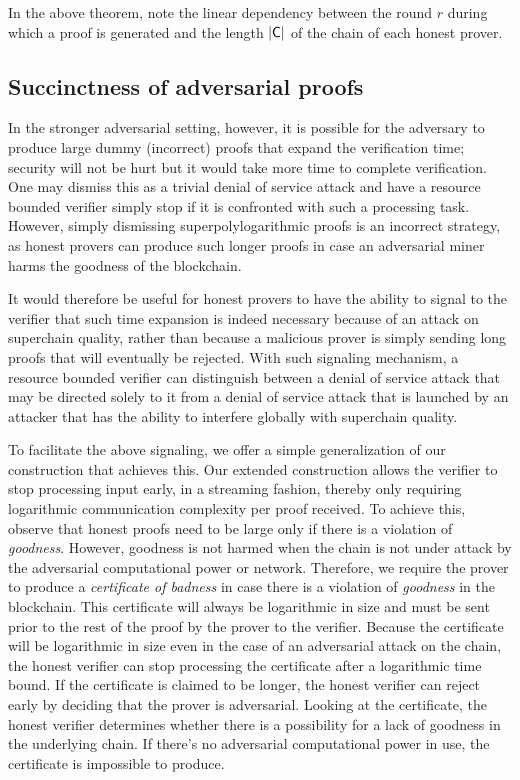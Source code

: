 In the above theorem, note the linear dependency between the round $r$ during
which a proof is generated and the length $|\mathsf{C}|$ of the chain of each honest
prover.

\subsection{Succinctness of adversarial proofs}
In the stronger adversarial setting, however, it is possible for the adversary
to produce large dummy (incorrect) proofs that expand the verification time;
security will not be hurt but it would take more time to complete verification.
One may dismiss this as a trivial denial of service attack and have a resource
bounded verifier simply stop if it is confronted with such a processing task.
However, simply dismissing superpolylogarithmic proofs is an incorrect strategy,
as honest provers can produce such longer proofs in case an adversarial miner
harms the goodness of the blockchain.

It would therefore be useful for honest provers to have the ability to
signal to the verifier that such time expansion is indeed necessary because of
an attack on superchain quality, rather than because a malicious prover is
simply sending long proofs that will eventually be rejected. With such signaling
mechanism, a resource bounded verifier can distinguish between a denial of
service attack that may be directed solely to it from  a denial of service
attack that  is launched by an attacker that has the ability to  interfere
globally with superchain quality.

To facilitate the above signaling, we offer a simple generalization of our
construction that achieves this. Our extended construction allows the verifier
to stop processing input early, in a streaming fashion, thereby only requiring
logarithmic communication complexity per proof received. To achieve this,
observe that honest proofs need to be large only if there is a violation of
\emph{goodness}. However, goodness is not harmed when the chain is not under
attack by the adversarial computational power or network. Therefore, we require
the prover to produce a \emph{certificate of badness} in case there is a
violation of \emph{goodness} in the blockchain. This certificate will always
be logarithmic in size and must be sent prior to the rest of the proof by the
prover to the verifier. Because the certificate will be logarithmic in size even
in the case of an adversarial attack on the chain, the honest verifier can stop
processing the certificate after a logarithmic time bound. If the certificate is
claimed to be longer, the honest verifier can reject early by deciding that the
prover is adversarial. Looking at the certificate, the honest verifier
determines whether there is a possibility for a lack of goodness in the
underlying chain. If there's no adversarial computational power in use, the
certificate is impossible to produce.

